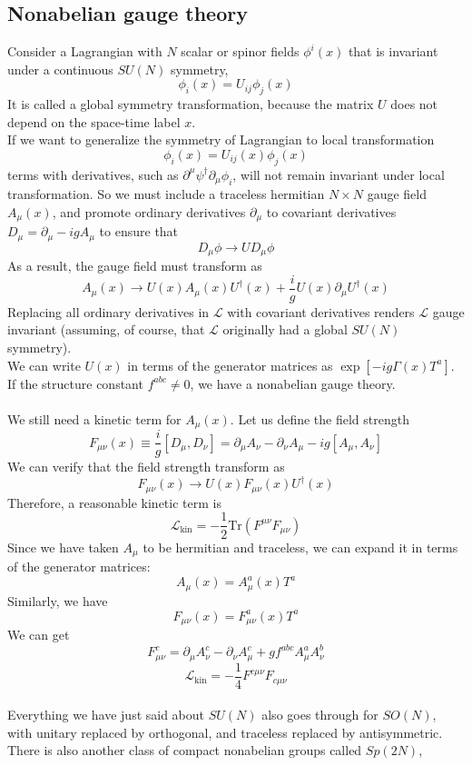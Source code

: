 \subsection{Nonabelian gauge theory}
Consider a Lagrangian with $N$ scalar or spinor fields $\phi^i(x)$ that is invariant under a continuous $SU(N)$ symmetry,
\[\phi_i(x) = U_{ij}\phi_j(x)\]
It is called a global symmetry transformation, because the matrix $U$ does not depend on the space-time label $x$.
\\
If we want to generalize the symmetry of Lagrangian to local transformation
\[\phi_i(x) = U_{ij}(x)\phi_j(x)\]
terms with derivatives, such as $\partial^{\mu}\psi^{\dagger} \partial_{\mu}\phi_i$, will not remain invariant under local transformation. 
So we must include a traceless hermitian $N \times N$ gauge field $A_{\mu}(x)$, and promote ordinary derivatives $\partial_{\mu}$ to covariant derivatives $D_{\mu} = \partial_{\mu} - igA_{\mu}$ to ensure that
\[D_{\mu}\phi \to UD_{\mu}\phi\]
As a result, the gauge field must transform as
\[A_{\mu}(x) \to U(x)A_{\mu}(x)U^{\dagger}(x) + \frac{i}{g}U(x)\partial_{\mu}U^{\dagger}(x)\]
Replacing all ordinary derivatives in $\mathcal{L}$ with covariant derivatives renders $\mathcal{L}$ gauge invariant (assuming, of course, that $\mathcal{L}$ originally had a global $SU(N)$ symmetry).\\
We can write $U(x)$ in terms of the generator matrices as
$\exp[-ig\Gamma(x)T^a]$. If the structure constant $f^{abc} \neq 0$, we have a nonabelian gauge theory.
\\ \\
We still need a kinetic term for $A_{\mu}(x)$. Let us define the field strength
\[F_{\mu\nu}(x) \equiv \frac{i}{g}[D_{\mu},D_{\nu}] = \partial_{\mu}A_{\nu} - \partial_{\nu}A_{\mu} - ig[A_{\mu},A_{\nu}]\]
We can verify that the field strength transform as
\[F_{\mu\nu}(x) \to U(x)F_{\mu\nu}(x)U^{\dagger}(x)\]
Therefore, a reasonable kinetic term is
\[\mathcal{L}_{\mathrm{kin}} = - \frac{1}{2} \mathrm{Tr}(F^{\mu\nu}F_{\mu\nu})\]
Since we have taken $A_{\mu}$ to be hermitian and traceless, we can expand it in terms of the generator matrices:
\[A_{\mu}(x) = A^a_{\mu}(x)T^a\]
Similarly, we have
\[F_{\mu\nu}(x) = F^a_{\mu\nu}(x)T^a \]
We can get
\[F^{c}_{\mu\nu} = \partial_{\mu}A^c_{\nu} - \partial_{\nu}A^c_{\mu} + gf^{abc}A^a_{\mu}A^b_{\nu}\]
\[\mathcal{L}_{\mathrm{kin}} = -\frac{1}{4}F^{c\mu\nu}F_{c\mu\nu}\]
\\
Everything we have just said about $SU(N)$ also goes through for $SO(N)$, with unitary replaced by orthogonal, and traceless replaced by antisymmetric. There is also another class of compact nonabelian groups called $Sp(2N)$,

